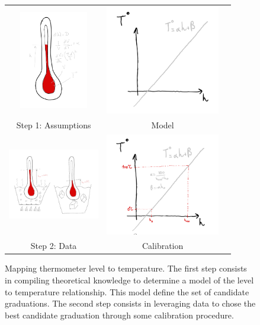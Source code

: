 \begin{bibunit}
\begin{figure}[h]
\begin{tabular}{ccc}
    \includegraphics[clip, width=3cm, width=3cm]{Introduction/pics/therm_theroy.png} &   \includegraphics[clip, width=5cm]{Introduction/pics/therm_model.png}  &   \\  Step 1: Assumptions & Model&\\ 
     \includegraphics[clip, width=4cm, height=4cm, trim={2cm 1cm 2cm 2cm}]{Introduction/pics/therm_obs.png} &    \includegraphics[clip, width=5cm]{Introduction/pics/therm_calib.png}   &  \\   Step 2: Data & Calibration&\\
\end{tabular}

    \caption{Mapping thermometer level to temperature. The first step consists in compiling theoretical knowledge to determine a model of the level to temperature relationship. This model define the set of candidate graduations. The second step consists in leveraging data to chose the best candidate graduation through some calibration procedure.}
    \label{fig:therm_mapping}
\end{figure}


\end{bibunit}
